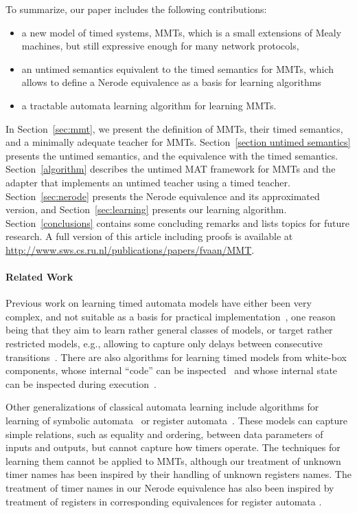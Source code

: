 To summarize, our paper includes the following contributions:
\begin{itemize}
\item
  a new model of timed systems, MMTs, which is a small extensions of Mealy machines, but still expressive enough for many network protocols,
  \item
    an untimed semantics equivalent to the timed semantics for MMTs, which allows
    to define a Nerode equivalence as a basis for learning algorithms
   \item
     a tractable automata learning algorithm for learning MMTs.
\end{itemize}

In Section~\ref{sec:mmt}, we present the definition of MMTs, their timed semantics, and a minimally adequate teacher for MMTs.
Section~\ref{section untimed semantics} presents the untimed semantics, and the
equivalence with the timed semantics.
Section~\ref{algorithm} describes the untimed MAT framework for MMTs and the adapter that implements an untimed teacher using a timed teacher.
Section~\ref{sec:nerode} presents the Nerode equivalence and its approximated
version, and
Section~\ref{sec:learning} presents our learning algorithm.
Section~\ref{conclusions} contains some concluding remarks and lists topics for future research.
\ifshort
A full version of this article including proofs is available at \url{http://www.sws.cs.ru.nl/publications/papers/fvaan/MMT}.
\fi

\paragraph{Related Work}
Previous work on learning timed automata models have either been very complex, and not suitable as a basis for
practical implementation~\cite{GrinchteinJP06,GrinchteinJL10}, one reason being that they aim to learn rather
general classes of models, or target rather restricted models, e.g., allowing to capture only
delays between consecutive transitions~\cite{VWW:rti,VWW:ic11}. 
There are also algorithms for learning timed models from white-box components,
whose internal ``code'' can be inspected~\cite{lin2014learning} and whose
internal state can be inspected during execution~\cite{maier2014online}.

Other generalizations of classical automata learning include algorithms for
learning of symbolic automata~\cite{MensM15,Drews:tacas17}
or register automata~\cite{HoStMe2011,HowarSJC12,CasselHJS16}. These models
can capture simple relations, such as equality and ordering,
between data parameters of inputs and outputs, but cannot capture how
timers operate. The techniques for learning them cannot be applied to
MMTs, although our treatment of unknown timer names has been inspired by
their handling of unknown registers names.
The treatment of timer names in our Nerode equivalence has also been inspired
by treatment of registers in corresponding equivalences for register automata
\cite{CasselHJMS15}.
